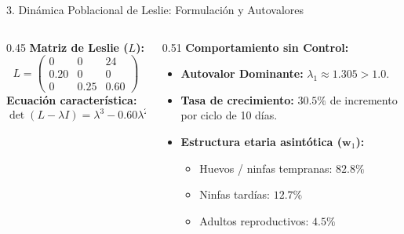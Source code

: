 \documentclass[
  spanish,
  aspectratio=169,
  xcolor={dvipsnames,table}
]{beamer}
\begin{document}
\begin{frame}{3. Dinámica Poblacional de Leslie: Formulación y Autovalores}
  \begin{columns}[T]
    \begin{column}{0.45\textwidth}
      \textbf{\color{uanlblue}Matriz de Leslie ($L$):}
      $$L = \begin{pmatrix}
        0 & 0 & 24 \\
        0.20 & 0 & 0 \\
        0 & 0.25 & 0.60
      \end{pmatrix}$$
      \vspace{0.2cm}
      \textbf{Ecuación característica:}
      $$\det(L - \lambda I) = \lambda^3 - 0.60\lambda^2 - 1.20 = 0$$
    \end{column}
    \begin{column}{0.51\textwidth}
      \textbf{\color{uanlblue}Comportamiento sin Control:}
      \begin{itemize}
        \item \textbf{Autovalor Dominante:} $\lambda_1 \approx 1.305 > 1.0$.
        \item \textbf{Tasa de crecimiento:} $30.5\%$ de incremento por ciclo de 10 días.
        \item \textbf{Estructura etaria asintótica ($\mathbf{w}_1$):}
          \begin{itemize}
            \item Huevos / ninfas tempranas: $82.8\%$
            \item Ninfas tardías: $12.7\%$
            \item Adultos reproductivos: $4.5\%$
          \end{itemize}
      \end{itemize}
    \end{column}
  \end{columns}
\end{frame}
\end{document}
